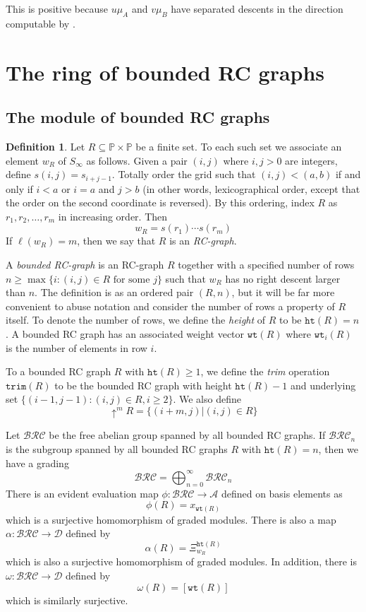 \documentclass{amsart}
\theoremstyle{definition}
\newtheorem{definition}[lemma]{Definition}
\theoremstyle{remark}
\numberwithin{equation}{subsection}
\newcommand{\shup}{{\uparrow}}
\newcommand{\wof}[1]{w_{#1}}
\newcommand{\wtt}{\mathtt{wt}}
\newcommand{\trm}{\mathtt{trim}}
\newcommand{\hr}{\mathtt{ht}}
\newcommand{\dsch}{\ensuremath{\Xi}}
\newcommand{\coma}{\mathcal{A}}
\newcommand{\dcoma}{\mathcal{D}}
\begin{document}
This is positive because $u\mu_A$ and $v\mu_B$ have separated descents in the direction computable by \cite[Theorem~3.1]{samuelmolev}.

\section{The ring of bounded RC graphs}

\subsection{The module of bounded RC graphs}

\begin{definition}\label{definition:rcgraph}
	Let $R\subseteq \mathbb{P}\times \mathbb{P}$ be a finite set. To each such set we associate an element $\wof{R}$ of $S_\infty$ as follows. Given a pair $(i, j)$ where $i,j>0$ are integers, define $s(i,j) = s_{i+j - 1}$. Totally order the grid such that $(i, j) < (a, b)$ if and only if $i < a$ or $i = a$ and $j > b$ (in other words, lexicographical order, except that the order on the second coordinate is reversed). By this ordering, index $R$ as $r_1, r_2,\ldots, r_m$ in increasing order. Then
	$$\wof{R} = s(r_1)\cdots s(r_m)$$
	If $\ell(\wof{R}) = m$, then we say that $R$ is an \emph{RC-graph}.
	
	A \emph{bounded RC-graph} is an RC-graph $R$ together with a specified number of rows $n\geq \max\{i: (i,j)\in R\text{ for some }j\}$ such that $\wof{R}$ has no right descent larger than $n$. The definition is as an ordered pair $(R, n)$, but it will be far more convenient to abuse notation and consider the number of rows a property of $R$ itself. To denote the number of rows, we define the \emph{height} of $R$ to be $\hr(R)=n$. A bounded RC graph has an associated weight vector $\wtt(R)$ where $\wtt_i(R)$ is the number of elements in row $i$.
	
	To a bounded RC graph $R$ with $\hr(R)\geq 1$, we define the \emph{trim} operation $\trm(R)$ to be the bounded RC graph with height $\hr(R)-1$ and underlying set $\{(i-1, j-1): (i,j)\in R, i\geq 2\}$. We also define
	$$\shup^m R=\{(i+m, j)| (i,j)\in R\}$$
\end{definition}

\newcommand{\BRC}{\mathcal{BRC}}
\newcommand{\RC}{\mathcal{RC}}

Let $\BRC$ be the free abelian group spanned by all bounded RC graphs. If $\BRC_n$ is the subgroup spanned by all bounded RC graphs $R$ with $\hr(R)=n$, then we have a grading
$$\BRC = \bigoplus_{n=0}^\infty \BRC_n$$
There is an evident evaluation map $\phi: \BRC\to \coma$ defined on basis elements as
$$\phi(R) = x_{\wtt(R)}$$
which is a surjective homomorphism of graded modules. There is also a map $\alpha:\BRC\to\dcoma$ defined by
$$\alpha(R) = \dsch_{\wof{R}}^{\hr(R)}$$
which is also a surjective homomorphism of graded modules. In addition, there is $\omega:\BRC\to \dcoma$ defined by
$$\omega(R) = [\wtt(R)]$$
which is similarly surjective.
\end{document}
